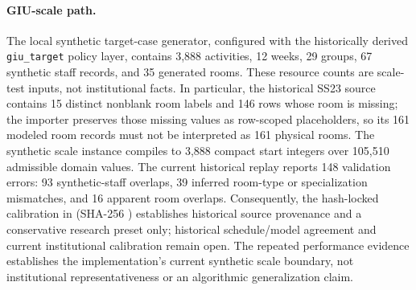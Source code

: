 \paragraph{GIU-scale path.}
The local synthetic target-case generator, configured with the historically derived \texttt{giu\_target} policy layer, contains 3,888 activities, 12 weeks, 29 groups, 67 synthetic staff records, and 35 generated rooms.
These resource counts are scale-test inputs, not institutional facts.
In particular, the historical SS23 source contains 15 distinct nonblank room labels and 146 rows whose room is missing; the importer preserves those missing values as row-scoped placeholders, so its 161 modeled room records must not be interpreted as 161 physical rooms.
The synthetic scale instance compiles to 3,888 compact start integers over 105,510 admissible domain values.
The current historical replay reports 148 validation errors: 93 synthetic-staff overlaps, 39 inferred room-type or specialization mismatches, and 16 apparent room overlaps.
Consequently, the hash-locked calibration in  (SHA-256 ) establishes historical source provenance and a conservative research preset only; historical schedule/model agreement and current institutional calibration remain open.
The repeated performance evidence establishes the implementation's current synthetic scale boundary, not institutional representativeness or an algorithmic generalization claim.

\newpage
